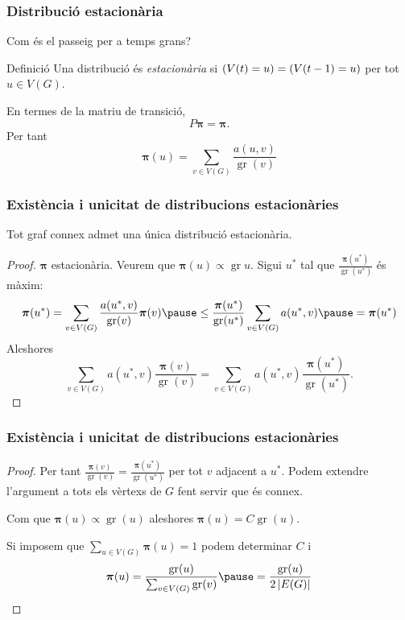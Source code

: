 \documentclass[aspectratio=169, 12pt]{beamer}
\let\P\relax
\DeclareMathOperator{\P}{P}
\renewcommand{\vec}[1]{\mathbf{\bm #1}}
\DeclareMathOperator{\gr}{gr}
\newcommand{\abs}[1]{\left\lvert #1 \right\rvert}
\begin{document}
\begin{frame}
	\frametitle{Distribució estacionària}
	Com és el passeig per a temps grans? \pause

	\begin{block}{Definició}
		Una distribució és \emph{estacionària} si \( \P(V(t) = u) = \P(V(t - 1) = u) \) per tot \( u \in V(G) \).
	\end{block} \pause

	En termes de la matriu de transició, \[ P\vec{\pi} = \vec{\pi}. \] \pause
	Per tant
	\begin{equation*}
		\vec{\pi}(u) = \sum_{v \in V(G)}\frac{a(u,v)}{\gr(v)}
	\end{equation*}

\end{frame}

\begin{frame}
	\frametitle{Existència i unicitat de distribucions estacionàries}
	\begin{theorem}
		Tot graf connex admet una única distribució estacionària.
	\end{theorem}
	\pause

	\begin{proof}
		\( \vec{\pi} \) estacionària. Veurem que \( \vec{\pi}(u) \propto \gr{u} \). \pause Sigui \( u^\ast \) tal que \( \frac{\vec{\pi}(u^\ast)}{\gr(u^\ast)} \) és màxim: \pause 
		\begin{equation*}
			\vec{\pi}(u^\ast) = \sum_{v \in V(G)} \frac{a(u^\ast,v)}{\gr(v)} \vec{\pi}(v) \pause \leq \frac{\vec{\pi}(u^\ast)}{\gr(u^\ast)} \sum_{v \in V(G)} a(u^{\ast},v) \pause = \vec{\pi}(u^\ast)
		\end{equation*}
		Aleshores \[ \sum_{v \in V(G)} a(u^\ast,v) \frac{\vec{\pi}(v)}{\gr(v)}  = \sum_{v \in V(G)} a(u^\ast,v) \frac{\vec{\pi}(u^\ast)}{\gr(u^\ast)}. \]  
\end{proof}
\end{frame}

\begin{frame}
	\frametitle{Existència i unicitat de distribucions estacionàries}
	\begin{proof}
		Per tant \( \frac{\vec{\pi}(v)}{\gr(v)} = \frac{\vec{\pi}(u^\ast)}{\gr(u^\ast)} \) per tot \( v \) adjacent a \( u^\ast \). \pause
			Podem extendre l'argument a tots els vèrtexs de \( G \) fent servir que és connex. \pause

		Com que \( \vec{\pi}(u) \propto \gr(u) \) aleshores \( \vec{\pi}(u) = C\gr(u) \). \pause
		
		Si imposem que \( \sum_{u \in V(G)} \vec{\pi}(u) = 1 \) podem determinar \( C \) i 
		\begin{equation*}
			\vec{\pi}(u) =  \frac{\gr(u)}{\sum_{v \in V(G)} \gr(v)} \pause = \frac{\gr(u)}{2 \abs{E(G)}}
		\end{equation*}

	\end{proof}
\end{frame}
\end{document}
